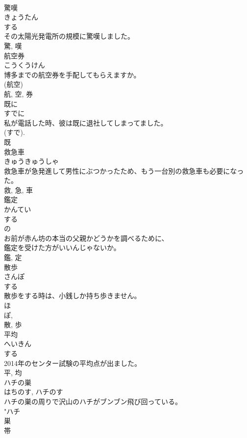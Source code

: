 \documentclass[8pt]{extreport}
\begin{document}
\begin{CJK}{UTF8}{min}
\\	驚嘆	
\\	きょうたん	
\\	する 
\\	その太陽光発電所の規模に驚嘆しました。	
\\	驚, 嘆	
\\	航空券	
\\	こうくうけん	
\\	博多までの航空券を手配してもらえますか。	
\\	(航空) 
\\	航, 空, 券	
\\	既に	
\\	すでに	
\\	私が電話した時、彼は既に退社してしまってました。	
\\	(すで). 
\\	既	
\\	救急車	
\\	きゅうきゅうしゃ	
\\	救急車が急発進して男性にぶつかったため、もう一台別の救急車も必要になった。	
\\	救, 急, 車	
\\	鑑定	
\\	かんてい	
\\	する 
\\	の 
\\	お前が赤ん坊の本当の父親かどうかを調べるために、
\\	鑑定を受けた方がいいんじゃないか。	
\\	鑑, 定	
\\	散歩	
\\	さんぽ	
\\	する 
\\	散歩をする時は、小銭しか持ち歩きません。	
\\	ほ 
\\	ぽ, 
\\	散, 歩	
\\	平均	
\\	へいきん	
\\	する 
\\	2014年のセンター試験の平均点が出ました。	
\\	平, 均	
\\	ハチの巣	
\\	はちのす, ハチのす	
\\	ハチの巣の周りで沢山のハチがブンブン飛び回っている。	
\\	"ハチ 
\\	巣	
\\	帯	

\end{CJK}
\end{document}
